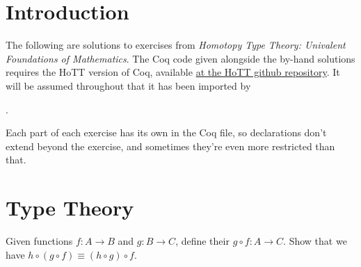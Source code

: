 \begin{coqdoccode}
\end{coqdoccode}


\section*{Introduction}


The following are solutions to exercises from
\textit{Homotopy Type Theory: Univalent Foundations of Mathematics}.  The Coq
code given alongside the by-hand solutions requires the HoTT version of Coq,
available \href{https://github.com/HoTT}{at the HoTT github repository}.  It
will be assumed throughout that it has been imported by \begin{coqdoccode}
\coqdocemptyline
\coqdocnoindent
{}  .\coqdoceol
\coqdocemptyline
\end{coqdoccode}
\noindent
Each part of each exercise has its own  in the Coq file, so 
declarations don't extend beyond the exercise, and sometimes they're even more
restricted than that.


\tableofcontents


\section{Type Theory}



Given functions $f:A\to B$ and $g:B\to C$, define their  
$g \circ f : A \to C$.  Show that we have $h \circ (g \circ f) \equiv (h \circ g) \circ f$.


